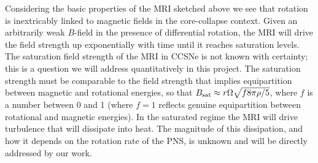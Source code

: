 \begin{comment}
\citet{Heger:2005bi} find that magnetic braking slows the rotation rate of massive stellar cores considerably; for their non-magnetic, rotating 25 $M_\odot$ progenitor, Heger et al. find a central core rotation rate of about 6 rad s$^{-1}$ whereas the same model including magnetic fields rotates at a much reduced rate of 0.6 rad s$^{-1}$. 
The magnitude of this breaking effect, based on a model for the Spruit-Taylor dynamo mechanism, scales with the magnitude of the initial zero-age, main-sequence field strength. 
For less magnetized progenitors, the cores retain a greater fraction of their initial angular momentum.  
These models, however, are certainly not the final word on core-collapse progenitors with rotation and magnetic fields; multidimensional evolutionary models are required and it is not at all clear that the treatments for convection and magnetic dynamo physics used accurately capture these physics.  
In a separate effort, we are incorporating novel treatments of the MRI into 1D evolutionary stellar models using the open-source MESA \citep{Paxton:2010jf}.  
If models with improved magnetic physics become available on time scales relevant to this project, we will explore their use in the proposed simulations.
\end{comment}

Considering the basic properties of the MRI sketched above we see that rotation is inextricably linked to magnetic fields in the core-collapse context.  
Given an arbitrarily weak $B$-field in the presence of differential rotation, the MRI will drive the field strength up exponentially with time until it reaches saturation levels.  
The saturation field strength of the MRI in CCSNe is not known with certainty; this is a question we will address quantitatively in this project.  
The saturation strength must be comparable to the field strength that implies equipartition between magnetic and rotational energies, so that $B_{\rm sat} \approx r \Omega\sqrt{f 8\pi \rho/5}$, where $f$ is a number between 0 and 1 (where $f=1$ reflects genuine equipartition between rotational and magnetic energies).  
In the saturated regime the MRI will drive turbulence that will dissipate into heat.  
The magnitude of this dissipation, and how it depends on the rotation rate of the PNS, is unknown and will be directly addressed by our work.  


